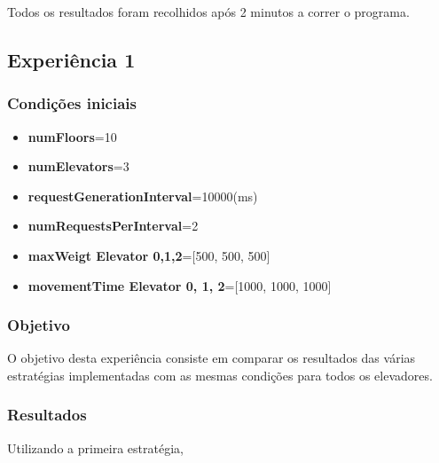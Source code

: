 \documentclass[a4paper]{article}
\begin{document}
Todos os resultados foram recolhidos após 2 minutos a correr o programa.

\subsection{Experiência 1}

\subsubsection{Condições iniciais}

\begin{itemize}
\item \textbf{numFloors}=10
\item \textbf{numElevators}=3
\item \textbf{requestGenerationInterval}=10000(ms)
\item \textbf{numRequestsPerInterval}=2
\item \textbf{maxWeigt Elevator 0,1,2}=[500, 500, 500]
\item \textbf{movementTime Elevator 0, 1, 2}=[1000, 1000, 1000]
\end{itemize}

\subsubsection{Objetivo} 

O objetivo desta experiência consiste em comparar os resultados das várias estratégias implementadas com as mesmas condições para todos os elevadores.

\subsubsection{Resultados}

Utilizando a primeira estratégia,
\end{document}
